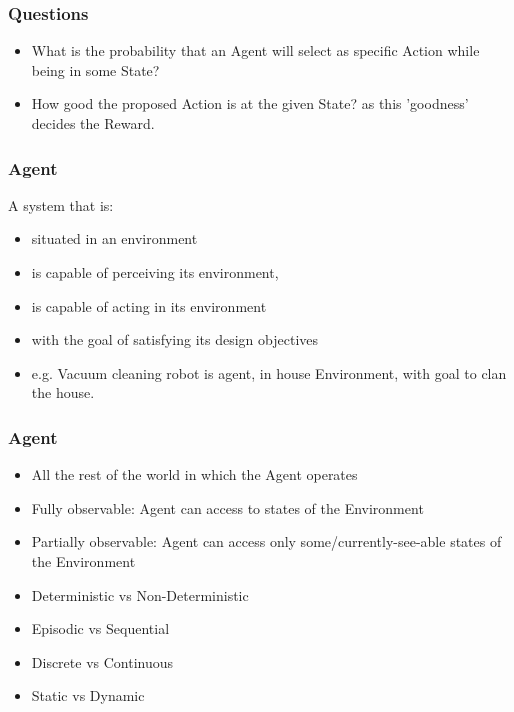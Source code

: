 \begin{frame}[fragile]\frametitle{Questions}

\begin{itemize}
\item What is the probability that an Agent will select as specific Action while being in some State?
\item How good the proposed Action is at the given State? as this 'goodness' decides the Reward.
\end{itemize}

\end{frame}

\begin{frame}[fragile]\frametitle{Agent}

A system that is:

\begin{itemize}
\item situated in an environment
\item is capable of perceiving its environment,
\item is capable of acting in its environment
\item with the goal of satisfying its design objectives
\item e.g. Vacuum cleaning robot is agent, in house Environment, with goal to clan the house.
\end{itemize}

\end{frame}

\begin{frame}[fragile]\frametitle{Agent}

\begin{itemize}
\item All the rest of the world in which the Agent operates
\item Fully observable: Agent can access to states of the Environment
\item Partially observable: Agent can access only some/currently-see-able states of the Environment
\item Deterministic vs Non-Deterministic
\item Episodic vs Sequential
\item Discrete vs Continuous
\item Static vs Dynamic
\end{itemize}

\end{frame}


